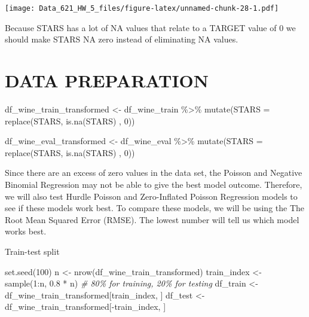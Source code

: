 \documentclass[
]{article}
\newenvironment{Shaded}{\begin{snugshade}}{\end{snugshade}}
\newcommand{\AttributeTok}[1]{\textcolor[rgb]{0.77,0.63,0.00}{#1}}
\newcommand{\CommentTok}[1]{\textcolor[rgb]{0.56,0.35,0.01}{\textit{#1}}}
\newcommand{\DecValTok}[1]{\textcolor[rgb]{0.00,0.00,0.81}{#1}}
\newcommand{\FloatTok}[1]{\textcolor[rgb]{0.00,0.00,0.81}{#1}}
\newcommand{\FunctionTok}[1]{\textcolor[rgb]{0.00,0.00,0.00}{#1}}
\newcommand{\NormalTok}[1]{#1}
\newcommand{\OtherTok}[1]{\textcolor[rgb]{0.56,0.35,0.01}{#1}}
\newcommand{\SpecialCharTok}[1]{\textcolor[rgb]{0.00,0.00,0.00}{#1}}
\begin{document}
\texttt{[image: Data\_621\_HW\_5\_files/figure-latex/unnamed-chunk-28-1.pdf]}

Because STARS has a lot of NA values that relate to a TARGET value of 0
we should make STARS NA zero instead of eliminating NA values.

\hypertarget{data-preparation}{%
\section{DATA PREPARATION}\label{data-preparation}}

\begin{Shaded}
\begin{Highlighting}[]
\NormalTok{df\_wine\_train\_transformed }\OtherTok{\textless{}{-}}\NormalTok{ df\_wine\_train }\SpecialCharTok{\%\textgreater{}\%} 
    \FunctionTok{mutate}\NormalTok{(}\AttributeTok{STARS =} \FunctionTok{replace}\NormalTok{(STARS, }\FunctionTok{is.na}\NormalTok{(STARS) , }\DecValTok{0}\NormalTok{))}

\NormalTok{df\_wine\_eval\_transformed  }\OtherTok{\textless{}{-}}\NormalTok{ df\_wine\_eval }\SpecialCharTok{\%\textgreater{}\%} 
    \FunctionTok{mutate}\NormalTok{(}\AttributeTok{STARS =} \FunctionTok{replace}\NormalTok{(STARS, }\FunctionTok{is.na}\NormalTok{(STARS) , }\DecValTok{0}\NormalTok{))}
\end{Highlighting}
\end{Shaded}

Since there are an excess of zero values in the data set, the Poisson
and Negative Binomial Regression may not be able to give the best model
outcome. Therefore, we will also test Hurdle Poisson and Zero-Inflated
Poisson Regression models to see if these models work best. To compare
these models, we will be using the The Root Mean Squared Error (RMSE).
The lowest number will tell us which model works best.

Train-test split

\begin{Shaded}
\begin{Highlighting}[]
\FunctionTok{set.seed}\NormalTok{(}\DecValTok{100}\NormalTok{)  }
\NormalTok{n }\OtherTok{\textless{}{-}} \FunctionTok{nrow}\NormalTok{(df\_wine\_train\_transformed)}
\NormalTok{train\_index }\OtherTok{\textless{}{-}} \FunctionTok{sample}\NormalTok{(}\DecValTok{1}\SpecialCharTok{:}\NormalTok{n, }\FloatTok{0.8} \SpecialCharTok{*}\NormalTok{ n)  }\CommentTok{\# 80\% for training, 20\% for testing}
\NormalTok{df\_train }\OtherTok{\textless{}{-}}\NormalTok{ df\_wine\_train\_transformed[train\_index, ]}
\NormalTok{df\_test }\OtherTok{\textless{}{-}}\NormalTok{ df\_wine\_train\_transformed[}\SpecialCharTok{{-}}\NormalTok{train\_index, ]}
\end{Highlighting}
\end{Shaded}
\end{document}
